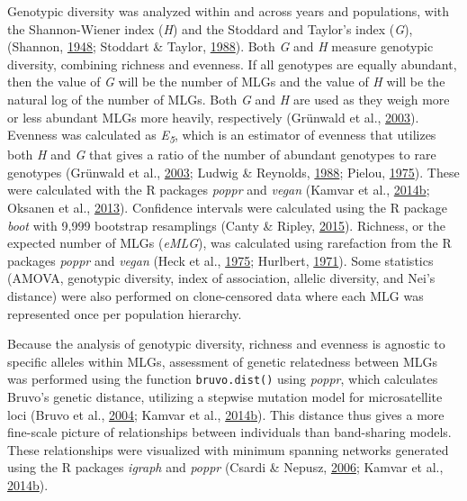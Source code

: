 \documentclass[double,11pt]{beavtex}
\begin{document}
  Genotypic diversity was analyzed within and across years and
  populations, with the Shannon-Wiener index (\emph{H}) and the Stoddard
  and Taylor's index (\emph{G}), (Shannon,
  \protect\hyperlink{ref-shannon2001mathematical}{1948}; Stoddart \&
  Taylor, \protect\hyperlink{ref-stoddart1988genotypic}{1988}). Both
  \emph{G} and \emph{H} measure genotypic diversity, combining richness
  and evenness. If all genotypes are equally abundant, then the value of
  \emph{G} will be the number of MLGs and the value of \emph{H} will be
  the natural log of the number of MLGs. Both \emph{G} and \emph{H} are
  used as they weigh more or less abundant MLGs more heavily, respectively
  (Grünwald et al., \protect\hyperlink{ref-grunwald2003analysis}{2003}).
  Evenness was calculated as \emph{E\textsubscript{5}}, which is an
  estimator of evenness that utilizes both \emph{H} and \emph{G} that
  gives a ratio of the number of abundant genotypes to rare genotypes
  (Grünwald et al., \protect\hyperlink{ref-grunwald2003analysis}{2003};
  Ludwig \& Reynolds, \protect\hyperlink{ref-ludwig1988statistical}{1988};
  Pielou, \protect\hyperlink{ref-pielou1975ecological}{1975}). These were
  calculated with the R packages \emph{poppr} and \emph{vegan} (Kamvar et
  al.,
  \protect\hyperlink{ref-kamvar2014poppr}{2014}\protect\hyperlink{ref-kamvar2014poppr}{b};
  Oksanen et al., \protect\hyperlink{ref-oksanen2013vegan}{2013}).
  Confidence intervals were calculated using the R package \emph{boot}
  with 9,999 bootstrap resamplings (Canty \& Ripley,
  \protect\hyperlink{ref-canty2015boot}{2015}). Richness, or the expected
  number of MLGs (\emph{eMLG}), was calculated using rarefaction from the
  R packages \emph{poppr} and \emph{vegan} (Heck et al.,
  \protect\hyperlink{ref-heck1975explicit}{1975}; Hurlbert,
  \protect\hyperlink{ref-hurlbert1971nonconcept}{1971}). Some statistics
  (AMOVA, genotypic diversity, index of association, allelic diversity,
  and Nei's distance) were also performed on clone-censored data where
  each MLG was represented once per population hierarchy.
  
  Because the analysis of genotypic diversity, richness and evenness is
  agnostic to specific alleles within MLGs, assessment of genetic
  relatedness between MLGs was performed using the function
  \texttt{bruvo.dist()} using \emph{poppr}, which calculates Bruvo's
  genetic distance, utilizing a stepwise mutation model for microsatellite
  loci (Bruvo et al., \protect\hyperlink{ref-bruvo2004simple}{2004};
  Kamvar et al.,
  \protect\hyperlink{ref-kamvar2014poppr}{2014}\protect\hyperlink{ref-kamvar2014poppr}{b}).
  This distance thus gives a more fine-scale picture of relationships
  between individuals than band-sharing models. These relationships were
  visualized with minimum spanning networks generated using the R packages
  \emph{igraph} and \emph{poppr} (Csardi \& Nepusz,
  \protect\hyperlink{ref-csardi2006igraph}{2006}; Kamvar et al.,
  \protect\hyperlink{ref-kamvar2014poppr}{2014}\protect\hyperlink{ref-kamvar2014poppr}{b}).
  
\end{document}
